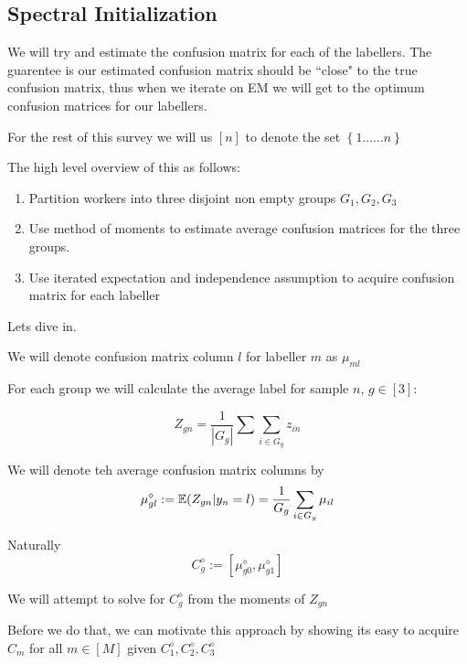 \subsection{Spectral Initialization}

We will try and estimate the confusion matrix for each of the labellers. The guarentee is our estimated confusion matrix should be ``close" to the true confusion matrix, thus when we iterate on EM we will get to the optimum confusion matrices for our labellers.

For the rest of this survey we will us $[n]$ to denote the set $\left\{1......n\right\}$

The high level overview of this as follows:

\begin{enumerate}
\item Partition workers into three disjoint non empty groups $G_{1},G_{2}, G_{3}$
\item Use method of moments to estimate average confusion matrices for the three groups.
\item Use iterated expectation and independence assumption to acquire confusion matrix for each labeller
\end{enumerate}

Lets dive in.

We will denote confusion matrix column $l$ for labeller $m$ as $\mu_{ml}$

For each group we will calculate the average label for sample $n$, $g \in [3]$:

\begin{equation}
Z_{gn} = \frac{1}{|G_{g}|} \displaystyle\sum\limits\sum_{i \in G_{g}} z_{in}
\end{equation}


We will denote teh average confusion matrix columns by 
\begin{equation}
\mu^{\diamond}_{gl} := \mathbb{E}(Z_{gn} | y_{n} = l) = \frac{1}{G_{g}} \displaystyle\sum\limits_{i \in G_{g}} \mu_{il}
\end{equation}

Naturally
\begin{equation}
C^{\diamond}_{g} := [\mu^{\diamond}_{g0},\mu^{\diamond}_{g1}]
\end{equation}

We will attempt to solve for $C^{\diamond}_{g}$ from the moments of $Z_{gn}$

Before we do that, we can motivate this approach by showing its easy to acquire $C_{m}$ for all $m \in [M]$  given $C^{\diamond}_{1},C^{\diamond}_{2},C^{\diamond}_{3}$ 


